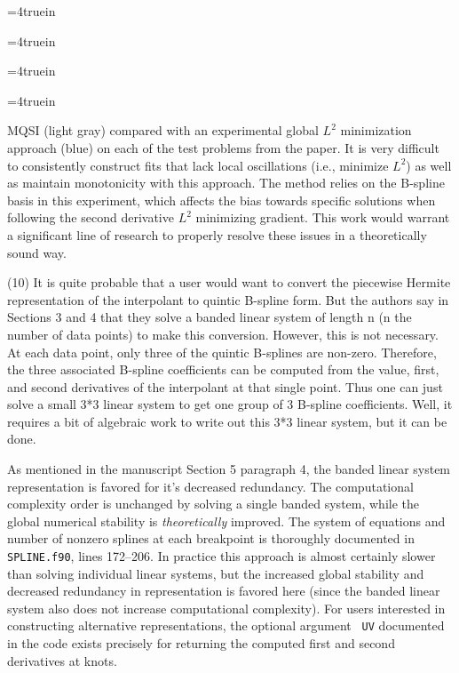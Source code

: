 \vfill

\centerline{\epsfxsize=4truein }
\centerline{\epsfxsize=4truein }
\centerline{\epsfxsize=4truein }
\centerline{\epsfxsize=4truein }
{ {\captt MQSI} (light
  gray) compared with an experimental global $L^2$ minimization
  approach (blue) on each of the test problems from the paper. It is
  {\capit very} difficult to consistently construct fits that lack
  local oscillations (i.e., minimize $L^2$) as well as maintain
  monotonicity with this approach. The method relies on the B-spline
  basis in this experiment, which affects the bias towards specific
  solutions when following the second derivative $L^2$ minimizing
  gradient. This work would warrant a significant line of research to
  properly resolve these issues in a theoretically sound way.
\par}
\vfill \eject


\goodbreak
{\parindent=20pt \it
  
\item{(10)} It is quite probable that a user would want to convert the
  piecewise Hermite representation of the interpolant to quintic
  B-spline form. But the authors say in Sections 3 and 4 that they
  solve a banded linear system of length n (n the number of data
  points) to make this conversion. However, this is not necessary. At
  each data point, only three of the quintic B-splines are
  non-zero. Therefore, the three associated B-spline coefficients can
  be computed from the value, first, and second derivatives of the
  interpolant at that single point. Thus one can just solve a small
  3*3 linear system to get one group of 3 B-spline coefficients. Well,
  it requires a bit of algebraic work to write out this 3*3 linear
  system, but it can be done.

}

As mentioned in the manuscript Section 5 paragraph 4, the banded
linear system representation is favored for it's decreased redundancy.
The computational complexity order is unchanged by solving a single
banded system, while the global numerical stability is {\it
  theoretically} improved. The system of equations and number of
nonzero splines at each breakpoint is thoroughly documented in
{\tt SPLINE.f90}, lines 172--206. In practice this approach is
almost certainly slower than solving individual linear systems, but
the increased global stability and decreased redundancy in
representation is favored here (since the banded linear system also
does not increase computational complexity). For users interested in
constructing alternative representations, the optional argument {\tt
  UV} documented in the code exists precisely for returning the
computed first and second derivatives at knots.


